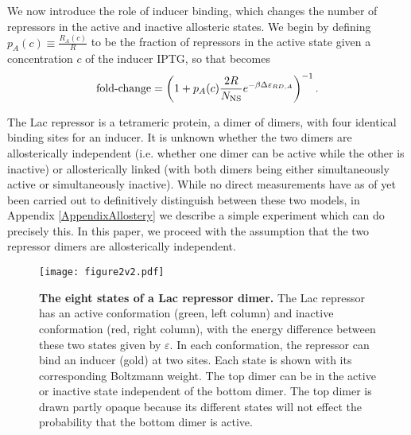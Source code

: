 We now introduce the role of inducer binding, which changes the number of
repressors in the active and inactive allosteric states. We begin by defining
\(p_A(c) \equiv \frac{R_A(c)}{R}\) to be the fraction of repressors in the
active state given a concentration \(c\) of the inducer IPTG, so that %
\eref[eq4] becomes
\begin{equation}
\operatorname{fold-change} = \left( 1+p_A(c) \frac{2 R}{N_{\text{NS}}}e^{-\beta 
	\Delta\varepsilon_{RD,A}} \right)^{-1}. \label{eq5}
\end{equation}

The Lac repressor is a tetrameric protein, a dimer of dimers, with four
identical binding sites for an inducer. It is unknown whether the two dimers are
allosterically independent (i.e. whether one dimer can be active while the other
is inactive) or allosterically linked (with both dimers being either
simultaneously active or simultaneously inactive). While no direct measurements
have as of yet been carried out to definitively distinguish between these two
models, in Appendix \ref{AppendixAllostery} we describe a simple experiment
which can do precisely this. In this paper, we proceed with the assumption that
the two repressor dimers are allosterically independent.

\begin{figure}[h]
	\centering \texttt{[image: figure2v2.pdf]}
	\caption{{\bf The eight states of a Lac repressor dimer.} The Lac repressor has
		an active conformation (green, left column) and inactive conformation (red,
		right column), with the energy difference between these two states given by
		$\varepsilon$. In each conformation, the repressor can bind an inducer (gold) at
		two sites. Each state is shown with its corresponding Boltzmann weight. The top
		dimer can be in the active or inactive state independent of the bottom dimer.
		The top dimer is drawn partly opaque because its different states will not
		effect the probability that the bottom dimer is active. %
	} \label{figrepressorInducerStates}
\end{figure}

